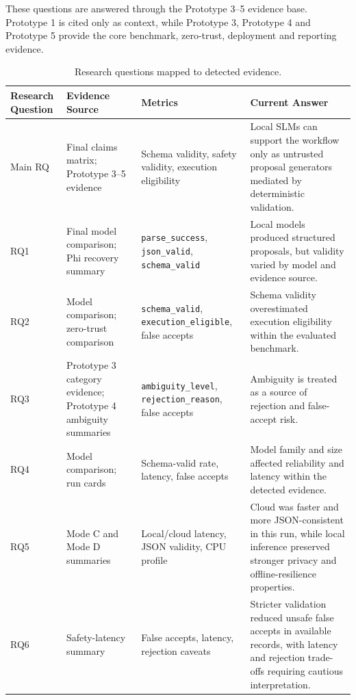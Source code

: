 \documentclass[sigconf,nonacm]{acmart}
\begin{document}
These questions are answered through the Prototype 3--5 evidence base. Prototype 1 is cited only as context, while Prototype 3, Prototype 4 and Prototype 5 provide the core benchmark, zero-trust, deployment and reporting evidence.

\begin{table}[t]
\centering
\caption{Research questions mapped to detected evidence.}
\label{tab:rq_to_evidence}
\footnotesize
\begin{tabularx}{\textwidth}{L{0.13\textwidth}Y Y Y}
\toprule
Research Question & Evidence Source & Metrics & Current Answer \\
\midrule
Main RQ & Final claims matrix; Prototype 3--5 evidence & Schema validity, safety validity, execution eligibility & Local SLMs can support the workflow only as untrusted proposal generators mediated by deterministic validation. \\

RQ1 & Final model comparison; Phi recovery summary & \texttt{parse\_success}, \texttt{json\_valid}, \texttt{schema\_valid} & Local models produced structured proposals, but validity varied by model and evidence source. \\

RQ2 & Model comparison; zero-trust comparison & \texttt{schema\_valid}, \texttt{execution\_eligible}, false accepts & Schema validity overestimated execution eligibility within the evaluated benchmark. \\

RQ3 & Prototype 3 category evidence; Prototype 4 ambiguity summaries & \texttt{ambiguity\_level}, \texttt{rejection\_reason}, false accepts & Ambiguity is treated as a source of rejection and false-accept risk. \\

RQ4 & Model comparison; run cards & Schema-valid rate, latency, false accepts & Model family and size affected reliability and latency within the detected evidence. \\

RQ5 & Mode C and Mode D summaries & Local/cloud latency, JSON validity, CPU profile & Cloud was faster and more JSON-consistent in this run, while local inference preserved stronger privacy and offline-resilience properties. \\

RQ6 & Safety-latency summary & False accepts, latency, rejection caveats & Stricter validation reduced unsafe false accepts in available records, with latency and rejection trade-offs requiring cautious interpretation. \\
\bottomrule
\end{tabularx}
\end{table}
\end{document}
